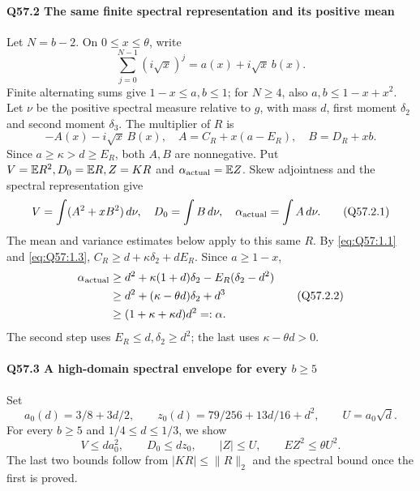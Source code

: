 \paragraph{Q57.2 The same finite spectral representation and its positive mean}
Let \(N=\allowbreak b-2\). On \(0\le\allowbreak  x\le\allowbreak \theta\), write
\[
\sum_{j=0}^{N-1}(i\sqrt x)^j=a(x)+i\sqrt x\,b(x).
\]
Finite alternating sums give \(1-x\le\allowbreak  a,\allowbreak b\le\allowbreak 1\); for \(N\ge\allowbreak 4\), also \(a,\allowbreak b\le\allowbreak 1-x+x^2\).
Let \(\nu\) be the positive spectral measure relative to \(g\), with mass \(d\), first moment \(\delta_2\) and second moment \(\delta_3\). The multiplier of \(R\) is
\[
-A(x)-i\sqrt x\,B(x),\quad
A=C_R+x(a-E_R),\quad B=D_R+xb .
\]
Since \(a\ge\allowbreak \kappa>\allowbreak d\ge\allowbreak  E_R\), both \(A,\allowbreak B\) are nonnegative.
Put \(V=\allowbreak \mathbb E R^2,\allowbreak D_0=\allowbreak \mathbb E R,\allowbreak Z=\allowbreak KR\) and
\(\alpha_{\rm actual}=\allowbreak \mathbb E Z\). Skew adjointness and the spectral representation give
\[
V=\int(A^2+xB^2)\,d\nu,\quad
D_0=\int B\,d\nu,\quad
\alpha_{\rm actual}=\int A\,d\nu . \tag{Q57.2.1}\label{eq:Q57:2.1}
\]
The mean and variance estimates below apply to this same \(R\).
By \eqref{eq:Q57:1.1} and \eqref{eq:Q57:1.3},
\(C_R\ge\allowbreak  d+\kappa\delta_2+dE_R\). Since \(a\ge\allowbreak 1-x\),
\[
\begin{aligned}
\alpha_{\rm actual}
&\ge d^2+\kappa(1+d)\delta_2-E_R(\delta_2-d^2)\\
&\ge d^2+(\kappa-\theta d)\delta_2+d^3\\
&\ge (1+\kappa+\kappa d)d^2=:\alpha .
\end{aligned} \tag{Q57.2.2}\label{eq:Q57:2.2}
\]
The second step uses \(E_R\le\allowbreak  d,\allowbreak \delta_2\ge\allowbreak  d^2\); the last uses
\(\kappa-\theta d>\allowbreak 0\).

\paragraph{Q57.3 A high-domain spectral envelope for every \(b\ge\allowbreak 5\)}
Set
\[
a_0(d)=3/8+3d/2,\qquad
z_0(d)=79/256+13d/16+d^2,\qquad U=a_0\sqrt d .
\]
For every \(b\ge\allowbreak 5\) and \(1/4\le\allowbreak  d\le\allowbreak 1/3\), we show
\[
V\le d a_0^2,\qquad D_0\le d z_0,\qquad
|Z|\le U,\qquad EZ^2\le\theta U^2 . \tag{Q57.3.1}\label{eq:Q57:3.1}
\]
The last two bounds follow from \(|KR|\le\allowbreak \|R\|_2\) and the spectral bound once the first is proved.

